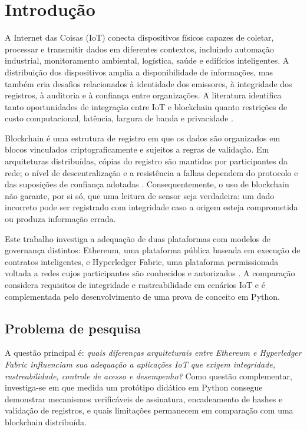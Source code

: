 \documentclass[10pt,a4paper,twocolumn]{article}
\begin{document}
\section{Introdução}
A Internet das Coisas (IoT) conecta dispositivos físicos capazes de coletar, processar e transmitir dados em diferentes contextos, incluindo automação industrial, monitoramento ambiental, logística, saúde e edifícios inteligentes. A distribuição dos dispositivos amplia a disponibilidade de informações, mas também cria desafios relacionados à identidade dos emissores, à integridade dos registros, à auditoria e à confiança entre organizações. A literatura identifica tanto oportunidades de integração entre IoT e blockchain quanto restrições de custo computacional, latência, largura de banda e privacidade \cite{Christidis2016,Dorri2017,Pajooh2022}.

Blockchain é uma estrutura de registro em que os dados são organizados em blocos vinculados criptograficamente e sujeitos a regras de validação. Em arquiteturas distribuídas, cópias do registro são mantidas por participantes da rede; o nível de descentralização e a resistência a falhas dependem do protocolo e das suposições de confiança adotadas \cite{Nakamoto2008,Yaga2018}. Consequentemente, o uso de blockchain não garante, por si só, que uma leitura de sensor seja verdadeira: um dado incorreto pode ser registrado com integridade caso a origem esteja comprometida ou produza informação errada.

Este trabalho investiga a adequação de duas plataformas com modelos de governança distintos: Ethereum, uma plataforma pública baseada em execução de contratos inteligentes, e Hyperledger Fabric, uma plataforma permissionada voltada a redes cujos participantes são conhecidos e autorizados \cite{Wood2014,Androulaki2018}. A comparação considera requisitos de integridade e rastreabilidade em cenários IoT e é complementada pelo desenvolvimento de uma prova de conceito em Python.

\subsection{Problema de pesquisa}
A questão principal é: \textit{quais diferenças arquiteturais entre Ethereum e Hyperledger Fabric influenciam sua adequação a aplicações IoT que exigem integridade, rastreabilidade, controle de acesso e desempenho?} Como questão complementar, investiga-se em que medida um protótipo didático em Python consegue demonstrar mecanismos verificáveis de assinatura, encadeamento de hashes e validação de registros, e quais limitações permanecem em comparação com uma blockchain distribuída.
\end{document}
